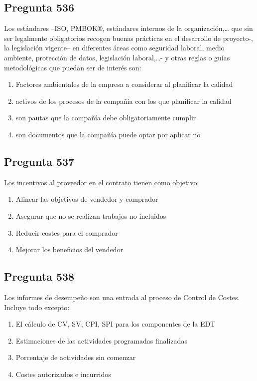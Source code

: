 \documentclass[11pt,a4paper]{article}
\begin{document}
\subsection*{Pregunta 536}
Los estándares –ISO, PMBOK®, estándares internos de la organización,… que sin ser legalmente obligatorios recogen buenas prácticas en el desarrollo de proyecto-, la legislación vigente– en diferentes áreas como seguridad laboral, medio ambiente, protección de datos, legislación laboral,…- y otras reglas o guías metodológicas que puedan ser de interés son:

\begin{enumerate}[label=\alph*)]
  \item Factores ambientales de la empresa a considerar al planificar la calidad
  \item activos de los procesos de la compañía con los que planificar la calidad
  \item son pautas que la compañía debe obligatoriamente cumplir
  \item son documentos que la compañía puede optar por aplicar no
\end{enumerate}

\subsection*{Pregunta 537}
Los incentivos al proveedor en el contrato tienen como objetivo:

\begin{enumerate}[label=\alph*)]
  \item Alinear las objetivos de vendedor y comprador
  \item Asegurar que no se realizan trabajos no incluidos
  \item Reducir costes para el comprador
  \item Mejorar los beneficios del vendedor
\end{enumerate}

\subsection*{Pregunta 538}
Los informes de desempeño son una entrada al proceso de Control de Costes. Incluye todo excepto:

\begin{enumerate}[label=\alph*)]
  \item El cálculo de CV, SV, CPI, SPI para los componentes de la EDT
  \item Estimaciones de las actividades programadas finalizadas
  \item Porcentaje de actividades sin comenzar
  \item Costes autorizados e incurridos
\end{enumerate}
\end{document}
